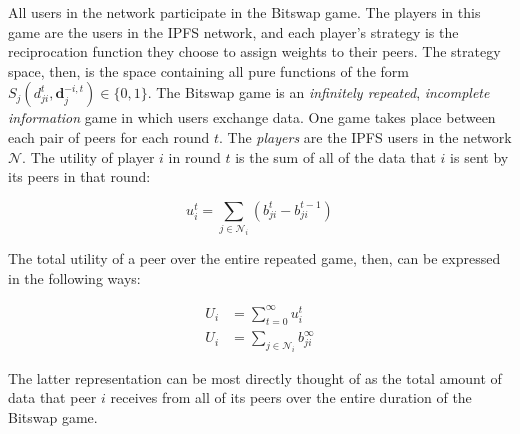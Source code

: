 \documentclass[12pt,letterpaper,]{article}
\newcommand{\Network}{\ensuremath{\mathcal{N}}}
\newcommand{\Nbhd}[1]{\ensuremath{\mathcal{N}_{#1}}}
\begin{document}
All users in the network participate in the Bitswap game. The players in
this game are the users in the IPFS network, and each player's strategy
is the reciprocation function they choose to assign weights to their
peers. The strategy space, then, is the space containing all pure
functions of the form
\(S_j(d_{ji}^t, \mathbf{d}_j^{-i,t}) \in \{0, 1\}\). The Bitswap game is
an \emph{infinitely repeated}, \emph{incomplete information} game in
which users exchange data. One game takes place between each pair of
peers for each round \(t\). The \emph{players} are the IPFS users in the
network \Network. The utility of player \(i\) in round \(t\) is the sum
of all of the data that \(i\) is sent by its peers in that round:

\[
u_i^t = \sum_{j \in \Nbhd{i}} (b_{ji}^t - b_{ji}^{t-1})
\]

The total utility of a peer over the entire repeated game, then, can be
expressed in the following ways:

\begin{align*}
U_i &= \sum_{t=0}^{\infty} u_i^t \\
U_i &= \sum_{j \in \Nbhd{i}} b_{ji}^\infty
\end{align*}

The latter representation can be most directly thought of as the total
amount of data that peer \(i\) receives from all of its peers over the
entire duration of the Bitswap game.

                

    
\end{document}
